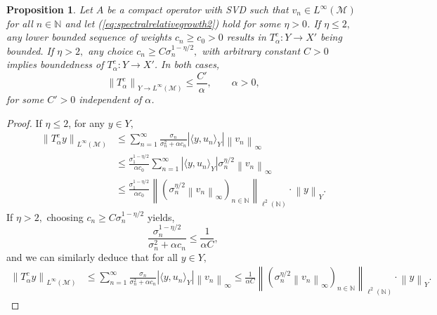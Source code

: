 \documentclass{article}
\newtheorem{proposition}[theorem]{Proposition}
\theoremstyle{definition}
\newcommand{\N}{\mathbb{N}}
\begin{document}
\begin{proposition}
\label{thm:spectralfilterbounded}
Let $A$ be a compact operator with SVD such that \(v_n\in L^\infty(\mathcal{M})\) for all \(n\in\N\) and let (\ref{eq:spectralrelativegrowth2}) hold for some $\eta>0$. If $\eta \leq 2,$ any lower bounded sequence of weights $c_n \geq c_0>0$ results in $T_\alpha^c: Y \to X'$ being bounded. If $\eta>2,$ any choice $c_n \geq C \sigma_n^{1-\eta/2},$ with arbitrary constant $C>0$ implies boundedness of  $T_\alpha^c: Y \to X'$. In both cases,
\[
\left\|T_\alpha^c  \right\|_{Y\to L^\infty(\mathcal{M})}\le \frac{C'}{\alpha},\qquad \alpha>0,
\]
for some $C'>0$ independent of $\alpha$.
\end{proposition}
\begin{proof}
If $\eta \leq 2$, for any $y \in Y,$  
\begin{align*}
\left\|T_\alpha^c y \right\|_{L^\infty(\mathcal{M})} &\leq \sum_{n=1}^\infty \frac{\sigma_n}{\sigma_n^2+\alpha c_n} \left|\langle y,u_n \rangle_Y\right| \left\|v_n\right\|_{\infty}\\
&\leq \frac{\sigma_1^{1-\eta/2}}{\alpha c_0} \sum_{n=1}^\infty \left|\langle y,u_n \rangle_Y\right| \sigma_n^{\eta/2} \left\|v_n\right\|_{\infty}\\
&\leq \frac{\sigma_1^{1-\eta/2}}{\alpha c_0}   \left\|\left( \sigma_n^{\eta/2} \left\|v_n\right\|_\infty \right)_{n \in \mathbb{N}} \right\|_{\ell^2(\mathbb{N})} \cdot \left\|y\right\|_Y.
\end{align*}
If $\eta>2,$ choosing $c_n \geq C \sigma_n^{1-\eta/2}$ yields,
$$
\frac{\sigma_n^{1-\eta/2}}{\sigma_n^2+\alpha c_n} \leq \frac{1}{\alpha C},
$$
and we can similarly deduce that for all $y \in Y,$
\begin{align*}
\left\|T_\alpha^c y \right\|_{L^\infty(\mathcal{M})} &\leq \sum_{n=1}^\infty \frac{\sigma_n}{\sigma_n^2+\alpha c_n} \left|\langle y,u_n \rangle_Y\right| \left\|v_n\right\|_{\infty} \leq \frac{1}{\alpha C} \left\|\left( \sigma_n^{\eta/2} \left\|v_n\right\|_\infty \right)_{n \in \mathbb{N}} \right\|_{\ell^2(\mathbb{N})} \cdot \left\|y\right\|_Y.
\end{align*}
\end{proof}
\end{document}
